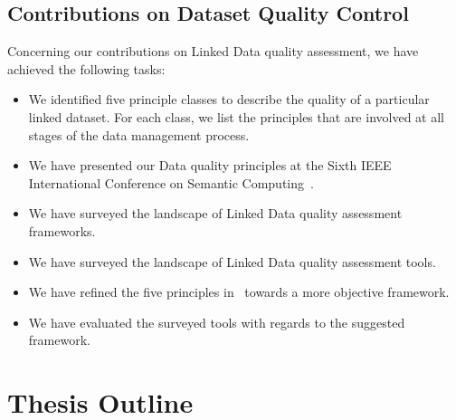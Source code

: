 \subsection{Contributions on Dataset Quality Control}
Concerning our contributions on Linked Data quality assessment, we have achieved the following tasks:
\begin{itemize}
\item We identified five principle classes to describe the quality of a particular linked dataset. For each class, we list the principles that are involved at all stages of the data management process.
\item We have presented our Data quality principles at the Sixth IEEE International Conference on Semantic Computing~\cite{Assaf:DQMST:12}.
\item We have surveyed the landscape of Linked Data quality assessment frameworks.
\item We have surveyed the landscape of Linked Data quality assessment tools.
\item We have refined the five principles in~\cite{Assaf:DQMST:12} towards a more objective framework.
\item We have evaluated the surveyed tools with regards to the suggested framework.
\end{itemize}

\section{Thesis Outline} \label{sec:outline}